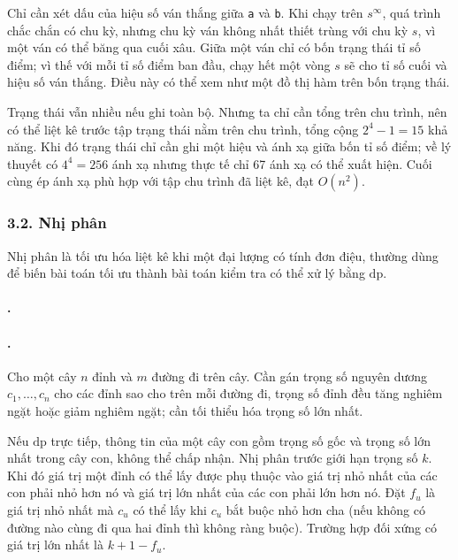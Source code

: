 \documentclass[11pt]{article}
\begin{document}
Chỉ cần xét dấu của hiệu số ván thắng giữa \texttt{a} và \texttt{b}. Khi chạy
trên \(s^\infty\), quá trình chắc chắn có chu kỳ, nhưng chu kỳ ván không nhất
thiết trùng với chu kỳ \(s\), vì một ván có thể băng qua cuối xâu. Giữa một ván
chỉ có bốn trạng thái tỉ số điểm; vì thế với mỗi tỉ số điểm ban đầu, chạy hết
một vòng \(s\) sẽ cho tỉ số cuối và hiệu số ván thắng. Điều này có thể xem như
một đồ thị hàm trên bốn trạng thái.

Trạng thái vẫn nhiều nếu ghi toàn bộ. Nhưng ta chỉ cần tổng trên chu trình, nên
có thể liệt kê trước tập trạng thái nằm trên chu trình, tổng cộng
\(2^4-1=15\) khả năng. Khi đó trạng thái chỉ cần ghi một hiệu và ánh xạ giữa
bốn tỉ số điểm; về lý thuyết có \(4^4=256\) ánh xạ nhưng thực tế chỉ 67 ánh xạ
có thể xuất hiện. Cuối cùng ép ánh xạ phù hợp với tập chu trình đã liệt kê,
đạt \(O(n^2)\).

\subsubsection*{3.2. Nhị phân}

Nhị phân là tối ưu hóa liệt kê khi một đại lượng có tính đơn điệu, thường dùng
để biến bài toán tối ưu thành bài toán kiểm tra có thể xử lý bằng
\(\mathrm{dp}\).

\paragraph{.}

\paragraph{.}
Cho một cây \(n\) đỉnh và \(m\) đường đi trên cây. Cần gán trọng số nguyên
dương \(c_1,\ldots,c_n\) cho các đỉnh sao cho trên mỗi đường đi, trọng số đỉnh
đều tăng nghiêm ngặt hoặc giảm nghiêm ngặt; cần tối thiểu hóa trọng số lớn
nhất.

Nếu \(\mathrm{dp}\) trực tiếp, thông tin của một cây con gồm trọng số gốc và
trọng số lớn nhất trong cây con, không thể chấp nhận. Nhị phân trước giới hạn
trọng số \(k\). Khi đó giá trị một đỉnh có thể lấy được phụ thuộc vào giá trị
nhỏ nhất của các con phải nhỏ hơn nó và giá trị lớn nhất của các con phải lớn
hơn nó. Đặt \(f_u\) là giá trị nhỏ nhất mà \(c_u\) có thể lấy khi \(c_u\) bắt
buộc nhỏ hơn cha (nếu không có đường nào cùng đi qua hai đỉnh thì không ràng
buộc). Trường hợp đối xứng có giá trị lớn nhất là \(k+1-f_u\).
\end{document}
